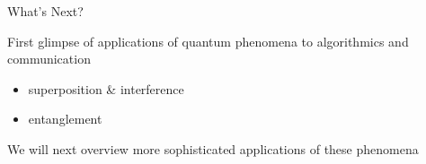 \documentclass{beamer}
\begin{document}
\begin{frame}{What's Next?}

        First glimpse of applications of quantum phenomena to algorithmics
        and communication
        \begin{itemize}
                \item superposition \& interference
                \item entanglement
        \end{itemize}

        We will next overview more sophisticated applications of these
        phenomena
\end{frame}
\end{document}
